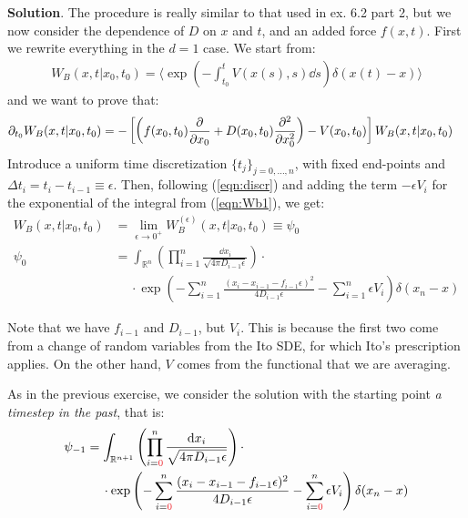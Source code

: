 \documentclass[../template.tex]{subfiles}
\begin{document}
\begin{exo}
    \textbf{Solution}. The procedure is really similar to that used in ex. 6.2 part 2, but we now consider the dependence of $D$ on $x$ and $t$, and an added force $f(x,t)$. First we rewrite everything in the $d=1$ case. We start from:
    \begin{align} \label{eqn:Wb1}
        W_B(x,t|x_0,t_0) = \langle \exp\left(-\int_{t_0}^t V(x(s),s) \dd{s}\right) \delta(x(t)-x)\rangle
    \end{align}
    and we want to prove that:
    \begin{align*}
        \partial_{t_0} W_B(x,t|x_0,t_0) &= -\left[\left(f(x_0,t_0) \pdv{x_0} + D(x_0,t_0) \pdv[2]{x_0}\right) - V(x_0,t_0) \right]W_B(x,t|x_0,t_0)
    \end{align*}
    Introduce a uniform time discretization $\{t_j\}_{j=0,\dots,n}$, with fixed end-points and $\Delta t_i = t_{i} - t_{i-1} \equiv \epsilon$. Then, following (\ref{eqn:discr}) and adding the term $-\epsilon V_i$ for the exponential of the integral from (\ref{eqn:Wb1}), we get:
    \begin{align*}
        W_B(x,t|x_0 ,t_0) &= \lim_{\epsilon \to 0^+} W_B^{(\epsilon)}(x,t|x_0,t_0) \equiv \psi_0\\
        \psi_0 &= \int_{\mathbb{R}^n} \left(\prod_{i=1}^n \frac{\dd{x_i}}{\sqrt{4\pi D_{i-1} \epsilon}} \right) \cdot\\
        &\quad\> \cdot \exp\left(-\sum_{i=1}^n\frac{(x_i - x_{i-1} - f_{i-1} \epsilon)^2}{4 D_{i-1} \epsilon}  - \sum_{i=1}^n\epsilon V_i\right) \delta(x_n - x)
    \end{align*}
    \begin{expl}
        Note that we have $f_{i-1}$ and $D_{i-1}$, but $V_i$. This is because the first two come from a change of random variables from the Ito SDE, for which Ito's prescription applies. On the other hand, $V$ comes from the functional that we are averaging.
    \end{expl}
    As in the previous exercise, we consider the solution with the starting point \textit{a timestep in the past}, that is:
    \begin{align*} 
        \psi_{-1} &= \int_{\mathbb{R}^{n+1}} \left(\prod_{i=\textcolor{Red}{0}}^n \frac{\dd{x_i}}{\sqrt{4\pi D_{i-1} \epsilon}} \right) \cdot\\
        &\quad\> \cdot \exp\left(-\sum_{i=\textcolor{Red}{0}}^n\frac{(x_i - x_{i-1} - f_{i-1} \epsilon)^2}{4 D_{i-1} \epsilon}  - \sum_{i=\textcolor{Red}{0}}^n\epsilon V_i\right) \delta(x_n - x)
    \end{align*} 

\end{exo}
\end{document}
